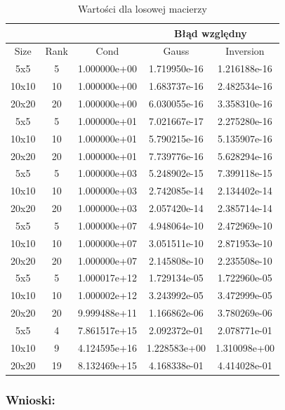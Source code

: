 \documentclass[12pt]{article}
\begin{document}
\newpage
\begin{table}[!h]
\small
\centering
    \label{tab:table3}
    \begin{tabular}{|c|c|c|c|c|}
    		\hline
		\multicolumn{3}{|c|}{} & \multicolumn{2}{c|}{Błąd względny}\\
		\hline
		Size & Rank & Cond & Gauss & Inversion\\
		\hline
5x5 & 5 & 1.000000e+00 & 1.719950e-16 & 1.216188e-16\\
\hline
10x10 & 10 & 1.000000e+00 & 1.683737e-16 & 2.482534e-16\\
\hline
20x20 & 20 & 1.000000e+00 & 6.030055e-16 & 3.358310e-16\\
\hline
5x5 & 5 & 1.000000e+01 & 7.021667e-17 & 2.275280e-16\\
\hline
10x10 & 10 & 1.000000e+01 & 5.790215e-16 & 5.135907e-16\\
\hline
20x20 & 20 & 1.000000e+01 & 7.739776e-16 & 5.628294e-16\\
\hline
5x5 & 5 & 1.000000e+03 & 5.248902e-15 & 7.399118e-15\\
\hline
10x10 & 10 & 1.000000e+03 & 2.742085e-14 & 2.134402e-14\\
\hline
20x20 & 20 & 1.000000e+03 & 2.057420e-14 & 2.385714e-14\\
\hline
5x5 & 5 & 1.000000e+07 & 4.948064e-10 & 2.472969e-10\\
\hline
10x10 & 10 & 1.000000e+07 & 3.051511e-10 & 2.871953e-10\\
\hline
20x20 & 20 & 1.000000e+07 & 2.145808e-10 & 2.235508e-10\\
\hline
5x5 & 5 & 1.000017e+12 & 1.729134e-05 & 1.722960e-05\\
\hline
10x10 & 10 & 1.000002e+12 & 3.243992e-05 & 3.472999e-05\\
\hline
20x20 & 20 & 9.999488e+11 & 1.166862e-06 & 3.780269e-06\\
\hline
5x5 & 4 & 7.861517e+15 & 2.092372e-01 & 2.078771e-01\\
\hline
10x10 & 9 & 4.124595e+16 & 1.228583e+00 & 1.310098e+00\\
\hline
20x20 & 19 & 8.132469e+15 & 4.168338e-01 & 4.414028e-01\\
\hline
    \end{tabular}
    \caption{Wartości dla losowej macierzy }
\end{table}

\subsubsection*{Wnioski:}
\end{document}
